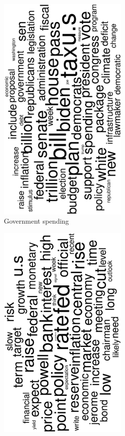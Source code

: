 \begin{figure}
	\begin{subfigure}{0.32\textwidth}
		\includegraphics[width=0.7\textwidth,angle=270]{figures/wordcloud7.eps}
		\caption{Government spending}
	\end{subfigure}
	\begin{subfigure}{0.32\textwidth}
		\includegraphics[width=0.7\textwidth,angle=270]{figures/wordcloud6.eps}

\end{subfigure}
\end{figure}
